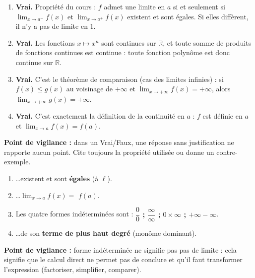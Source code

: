 \documentclass[11pt]{article}
\begin{document}
\begin{corrige}
\begin{enumerate}
\item \textbf{Vrai.} Propriété du cours : $f$ admet une limite en $a$ si et seulement si $\displaystyle\lim_{x\to a^-}f(x)$ et $\displaystyle\lim_{x\to a^+}f(x)$ existent et sont égales. Si elles diffèrent, il n'y a pas de limite en $1$.
\item \textbf{Vrai.} Les fonctions $x\mapsto x^n$ sont continues sur $\mathbb{R}$, et toute somme de produits de fonctions continues est continue : toute fonction polynôme est donc continue sur $\mathbb{R}$.
\item \textbf{Vrai.} C'est le théorème de comparaison (cas des limites infinies) : si $f(x)\leq g(x)$ au voisinage de $+\infty$ et $\displaystyle\lim_{x\to+\infty}f(x)=+\infty$, alors $\displaystyle\lim_{x\to+\infty}g(x)=+\infty$.
\item \textbf{Vrai.} C'est exactement la définition de la continuité en $a$ : $f$ est définie en $a$ et $\displaystyle\lim_{x\to a}f(x)=f(a)$.
\end{enumerate}
\textbf{Point de vigilance :} dans un Vrai/Faux, une réponse sans justification ne rapporte aucun point. Cite toujours la propriété utilisée ou donne un contre-exemple.
\end{corrige}

\begin{corrige}
\begin{enumerate}
\item \ldots existent et sont \textbf{égales} (à $\ell$).
\item \ldots $\displaystyle\lim_{x\to a}f(x)=$ \textbf{$f(a)$}.
\item Les quatre formes indéterminées sont : \textbf{$\dfrac{0}{0}$ ; $\dfrac{\infty}{\infty}$ ; $0\times\infty$ ; $+\infty-\infty$}.
\item \ldots de son \textbf{terme de plus haut degré} (monôme dominant).
\end{enumerate}
\textbf{Point de vigilance :} \og forme indéterminée \fg{} ne signifie pas \og pas de limite \fg{} : cela signifie que le calcul direct ne permet pas de conclure et qu'il faut transformer l'expression (factoriser, simplifier, comparer).
\end{corrige}
\end{document}
